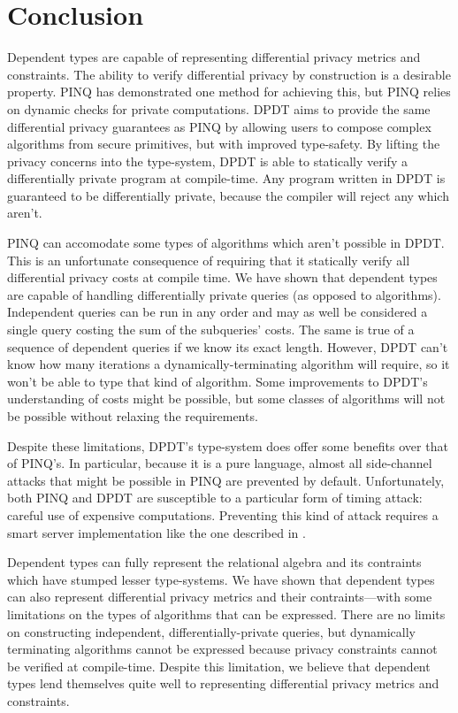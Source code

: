 \documentclass[12pt]{report}
\begin{document}
\chapter{Conclusion}\label{sec:conclusion}

Dependent types are capable of representing differential privacy metrics and constraints.
The ability to verify differential privacy by construction is a desirable property.
PINQ has demonstrated one method for achieving this, but PINQ relies on dynamic checks for private computations.
DPDT aims to provide the same differential privacy guarantees as PINQ by allowing users to compose complex algorithms from secure primitives, but with improved type-safety.
By lifting the privacy concerns into the type-system, DPDT is able to statically verify a differentially private program at compile-time.
Any program written in DPDT is guaranteed to be differentially private, because the compiler will reject any which aren't.

PINQ can accomodate some types of algorithms which aren't possible in DPDT.
This is an unfortunate consequence of requiring that it statically verify all differential privacy costs at compile time.
We have shown that dependent types are capable of handling differentially private queries (as opposed to algorithms).
Independent queries can be run in any order and may as well be considered a single query costing the sum of the subqueries' costs.
The same is true of a sequence of dependent queries if we know its exact length.
However, DPDT can't know how many iterations a dynamically-terminating algorithm will require, so it won't be able to type that kind of algorithm.
Some improvements to DPDT's understanding of costs might be possible, but some classes of algorithms will not be possible without relaxing the requirements.

Despite these limitations, DPDT's type-system does offer some benefits over that of PINQ's.
In particular, because it is a pure language, almost all side-channel attacks that might be possible in PINQ are prevented by default.
Unfortunately, both PINQ and DPDT are susceptible to a particular form of timing attack: careful use of expensive computations.
Preventing this kind of attack requires a smart server implementation like the one described in \cite{conf/uss/HaeberlenPN11}.

Dependent types can fully represent the relational algebra and its contraints which have stumped lesser type-systems\cite{OurySwierstra08PowerOfPi}.
We have shown that dependent types can also represent differential privacy metrics and their contraints---with some limitations on the types of algorithms that can be expressed.
There are no limits on constructing independent, differentially-private queries, but dynamically terminating algorithms cannot be expressed because privacy constraints cannot be verified at compile-time.
Despite this limitation, we believe that dependent types lend themselves quite well to representing differential privacy metrics and constraints.



\end{document}
